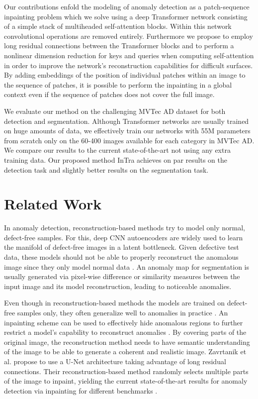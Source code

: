 \documentclass[runningheads]{llncs}
\begin{document}
Our contributions enfold the modeling of anomaly detection as a patch-sequence inpainting problem which we solve using a deep Transformer network consisting of a simple stack of multiheaded self-attention blocks. Within this network convolutional operations are removed entirely. Furthermore we propose to employ long residual connections between the Transformer blocks and to perform a nonlinear dimension reduction for keys and queries when computing self-attention
in order to improve the network's reconstruction capabilities for difficult surfaces. By adding embeddings of the position of individual patches within an image to the sequence of patches, it is possible to perform the inpainting in a global context even if the sequence of patches does not cover the full image.

We evaluate our method on the challenging MVTec AD dataset \cite{MvtecAd2019} for both detection and segmentation. Although Transformer networks are usually trained on huge amounts of data, we effectively train our networks with 55M parameters from scratch only on the 60-400 images available for each category in MVTec AD. We compare our results to the current state-of-the-art not using any extra training data. Our proposed method InTra achieves on par results on the detection task and slightly better results on the segmentation task.

\section{Related Work}
\label{sec:rel_work}

In anomaly detection, reconstruction-based methods try to model only normal, defect-free samples. For this, deep CNN autoencoders are widely used to learn the manifold of defect-free images in a latent bottleneck. Given defective test data, these models should not be able to properly reconstruct the anomalous image since they only model normal data \cite{CHOW2020101105,Sakurada2014autencoder,Baur_2019}. An anomaly map for segmentation is usually generated via pixel-wise difference or similarity measures between the input image and its model reconstruction, leading to noticeable anomalies.

Even though in reconstruction-based methods the models are trained on defect-free samples only, they often generalize well to anomalies in practice \cite{gong2019memorizing}.
An inpainting scheme can be used to effectively hide anomalous regions to further restrict a model's capability to reconstruct anomalies \cite{Bhattad2018DetectingAF,8614226,ZAVRTANIK2021107706,DBLP:journals/corr/abs-2010-01942}. By covering parts of the original image, the reconstruction method needs to have semantic understanding of the image to be able to generate a coherent and realistic image. Zavrtanik et al. propose to use a U-Net architecture \cite{10.1007/978-3-319-24574-4_28} taking advantage of long residual connections. Their reconstruction-based method randomly selects multiple parts of the image to inpaint, yielding the current state-of-the-art results for anomaly detection via inpainting for different benchmarks \cite{ZAVRTANIK2021107706}.
\end{document}
